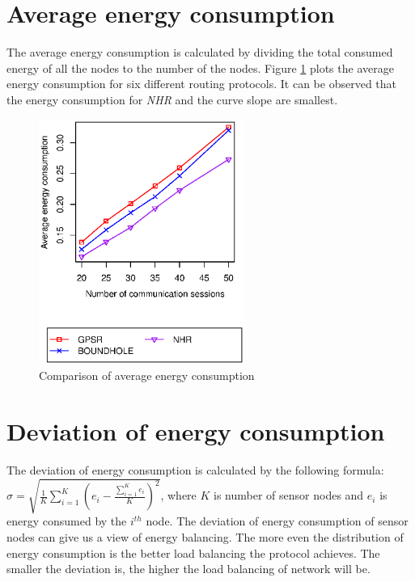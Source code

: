 \section{Average energy consumption}
The average energy consumption is calculated by dividing the total consumed energy of all the nodes to the number of the nodes. Figure \ref{fig-energy} plots the average energy consumption for six different routing protocols. It can be observed that the energy consumption for \emph{NHR} and the curve slope are smallest.
\begin{figure}[!htb]
  \centering
  \captionsetup{justification=centering}
  \includegraphics[width=0.6\textwidth]{Chapter7/Chapter7Figs/energy.eps}
\caption{Comparison of average energy consumption}
\label{fig-energy}
\end{figure}


\section{Deviation of energy consumption}
The deviation of energy consumption is calculated by the following formula: $\sigma = \sqrt{\frac{1}{K}\sum_{i=1}^{K}\left ( e_i - \frac{\sum_{i=1}^{K}e_i}{K} \right )^2}$, where $K$ is number of sensor nodes and $e_i$ is energy consumed by the $i^{th}$ node. The deviation of energy consumption of sensor nodes can give us a view of energy balancing. The more even the distribution of energy consumption is the better load balancing the protocol achieves. The smaller the deviation is, the higher the load balancing of network will be. 

